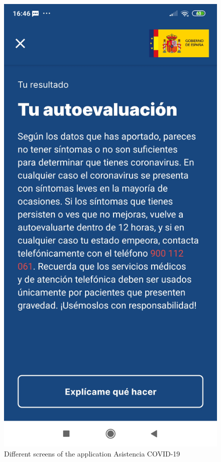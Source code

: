 \documentclass[a4paper, 12pt]{article}
\begin{document}
\begin{figure}[!htb]
\begin{minipage}{0.33\textwidth}
   \end{minipage}
   \begin{minipage}{0.33\textwidth}
     \centering
     \includegraphics[scale=0.06]{images/discussion/asistencia-covid-3.jpg}
   \end{minipage}
   \caption{Different screens of the application Asistencia COVID-19}
   \label{fig:asistencia-covid-19}
\end{figure}
\end{document}
